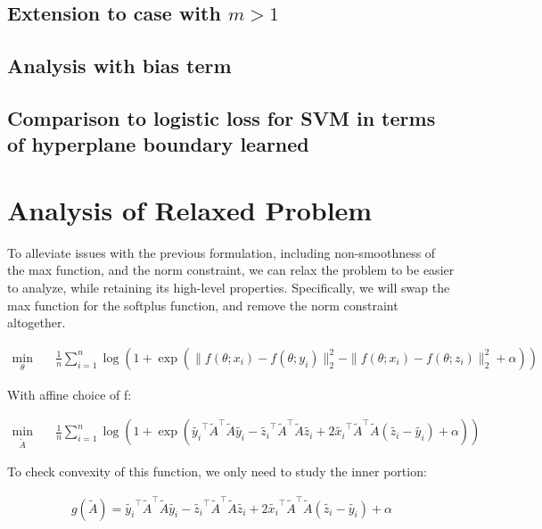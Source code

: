 \documentclass[11pt]{article}
\begin{document}
\subsection{Extension to case with $m > 1$}

\subsection{Analysis with bias term}

\subsection{Comparison to logistic loss for SVM in terms of hyperplane boundary learned}


\section{Analysis of Relaxed Problem}

To alleviate issues with the previous formulation, including non-smoothness of the max function, and the norm constraint, we can relax the problem to be easier to analyze, while retaining its high-level properties. Specifically, we will swap the max function for the softplus function, and remove the norm constraint altogether.

\begin{equation}
\begin{aligned}
    \min_{\theta} \quad & \frac{1}{n} \sum_{i=1}^{n} \log{(1 + \exp{( \| f(\theta; x_i) - f(\theta; y_i)\|_2^2 - \| f(\theta; x_i) - f(\theta; z_i)\|_2^2 + \alpha)})}
\end{aligned}
\end{equation}

With affine choice of f:

\begin{equation}
\label{eq:smooth_problem}
\begin{aligned}
    \min_{\tilde{A}} \quad & \frac{1}{n} \sum_{i=1}^{n} \log{(1 + \exp{(\tilde{y_i}^\top\tilde{A}^\top\tilde{A}\tilde{y_i} - \tilde{z_i}^\top\tilde{A}^\top\tilde{A}\tilde{z_i} + 2\tilde{x_i}^\top\tilde{A}^\top\tilde{A}(\tilde{z_i} - \tilde{y_i}) + \alpha)})}
\end{aligned}
\end{equation}

To check convexity of this function, we only need to study the inner portion:

\begin{equation}
\begin{aligned}
g(\tilde{A}) = \tilde{y_i}^\top\tilde{A}^\top\tilde{A}\tilde{y_i} - \tilde{z_i}^\top\tilde{A}^\top\tilde{A}\tilde{z_i} + 2\tilde{x_i}^\top\tilde{A}^\top\tilde{A}(\tilde{z_i} - \tilde{y_i}) + \alpha
\end{aligned}
\end{equation}
\end{document}
